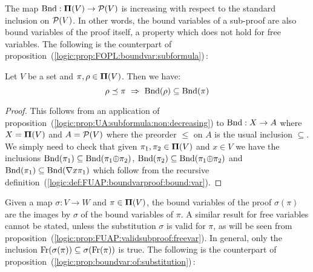 The map $\mbox{\rm Bnd}:\mbox{${\bf\Pi}(V)$}\to{\cal P}(V)$ is increasing with respect to
the standard inclusion on ${\cal P}(V)$. In other words, the bound
variables of a sub-proof are also bound variables of the proof
itself, a property which does not hold for free variables. The
following is the counterpart of
proposition~(\ref{logic:prop:FOPL:boundvar:subformula})\,:
\begin{prop}\label{logic:prop:FUAP:boundvarproof:subformula}
Let $V$ be a set and $\pi,\rho\in\mbox{${\bf\Pi}(V)$}$. Then we have:
    \[
    \rho\preceq\pi\ \Rightarrow\ \bound(\rho)\subseteq\bound(\pi)
    \]
\end{prop}
\begin{proof}
This follows from an application of
proposition~(\ref{logic:prop:UA:subformula:non:decreasing}) to
$\mbox{\rm Bnd}:X\to A$ where $X=\mbox{${\bf\Pi}(V)$}$ and $A={\cal P}(V)$ where the
preorder $\leq$ on $A$ is the usual inclusion $\subseteq$. We simply
need to check that given $\pi_{1},\pi_{2}\in\mbox{${\bf\Pi}(V)$}$ and $x\in V$ we
have the inclusions
$\mbox{\rm Bnd}(\pi_{1})\subseteq\mbox{\rm Bnd}(\pi_{1}\mbox{$\oplus$}\pi_{2})$,
$\mbox{\rm Bnd}(\pi_{2})\subseteq\mbox{\rm Bnd}(\pi_{1}\mbox{$\oplus$}\pi_{2})$ and
$\mbox{\rm Bnd}(\pi_{1})\subseteq\mbox{\rm Bnd}(\mbox{$\nabla$} x\pi_{1})$ which follow from
the recursive
definition~(\ref{logic:def:FUAP:boundvarproof:bound:var}).
\end{proof}

Given a map $\sigma:V\to W$ and $\pi\in\mbox{${\bf\Pi}(V)$}$, the bound variables of
the proof $\sigma(\pi)$ are the images by $\sigma$ of the bound
variables of $\pi$. A similar result for free variables cannot be
stated, unless the substitution $\sigma$ is valid for $\pi$, as will
be seen from
proposition~(\ref{logic:prop:FUAP:validsubproof:freevar}). In
general, only the inclusion
$\mbox{\rm Fr}(\sigma(\pi))\subseteq\sigma(\mbox{\rm Fr}(\pi))$ is true. The
following is the counterpart of
proposition~(\ref{logic:prop:boundvar:of:substitution})\,:

